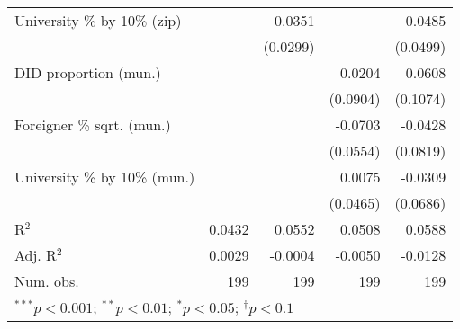 \begin{tabular}{l D{.}{.}{3.5} D{.}{.}{3.5} D{.}{.}{3.5} D{.}{.}{3.5}}
University \% by 10\% (zip)       &          & 0.0351   &          & 0.0485   \\
                                  &          & (0.0299) &          & (0.0499) \\
DID proportion (mun.)             &          &          & 0.0204   & 0.0608   \\
                                  &          &          & (0.0904) & (0.1074) \\
Foreigner \% sqrt. (mun.)         &          &          & -0.0703  & -0.0428  \\
                                  &          &          & (0.0554) & (0.0819) \\
University \% by 10\% (mun.)      &          &          & 0.0075   & -0.0309  \\
                                  &          &          & (0.0465) & (0.0686) \\
\midrule
R$^2$                             & 0.0432   & 0.0552   & 0.0508   & 0.0588   \\
Adj. R$^2$                        & 0.0029   & -0.0004  & -0.0050  & -0.0128  \\
Num. obs.                         & 199      & 199      & 199      & 199      \\
\bottomrule
{}
\end{tabular}
